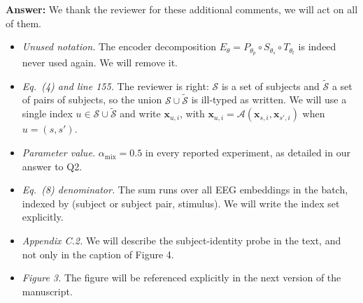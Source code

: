 \documentclass[11pt]{article}
\newcommand{\answer}[1]{{\textbf{Answer:} \color{blue} #1}}
\begin{document}
\answer{
We thank the reviewer for these additional comments, we will act on all of them.
\begin{itemize}
\item \emph{Unused notation.} The encoder decomposition $E_\theta = P_{\theta_p} \circ S_{\theta_s} \circ
T_{\theta_t}$ is indeed never used again. We will remove it.
\item \emph{Eq.~(4) and line 155.} The reviewer is right: $\mathcal{S}$ is a set of subjects and
$\widetilde{\mathcal{S}}$ a set of pairs of subjects, so the union $\mathcal{S} \cup
\widetilde{\mathcal{S}}$ is ill-typed as written. We will use a single index $u \in \mathcal{S} \cup
\widetilde{\mathcal{S}}$ and write $\mathbf{x}_{u,i}$, with $\mathbf{x}_{u,i} =
\mathcal{A}(\mathbf{x}_{s,i}, \mathbf{x}_{s',i})$ when $u = (s,s')$.
\item \emph{Parameter value.} $\alpha_{\mathrm{mix}} = 0.5$ in every reported experiment, as detailed in
our answer to Q2.
\item \emph{Eq.~(8) denominator.} The sum runs over all EEG embeddings in the batch, indexed by
(subject or subject pair, stimulus). We will write the index set explicitly.
\item \emph{Appendix C.2.} We will describe the subject-identity probe in the text, and not only in the
caption of Figure 4.
\item \emph{Figure 3.} The figure will be referenced explicitly in the next version of the manuscript.
\end{itemize}
}
\end{document}
